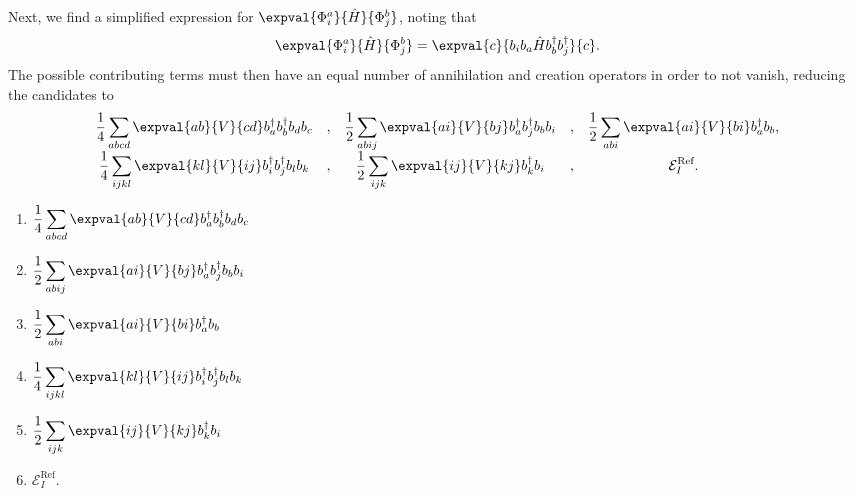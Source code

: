 Next, we find a simplified expression for $\expval{\Phi_i^a}{\hat{H}}{\Phi_j^b}$,
noting that
\begin{equation*}
    \expval{\Phi_i^a}{\hat{H}}{\Phi_j^b} = \expval{c}{b_i b_a \hat{H} b_b^\dagger b_j^\dagger}{c}.
\end{equation*}
The possible contributing terms must then have an equal number of annihilation and creation operators in order to not vanish, reducing the candidates to
\begin{equation*} %
    \begin{array}{cccccc}
        \displaystyle\frac{1}{4} \sum_{abcd} \expval{ab}{V}{cd} b_a^\dagger b_b^\dagger b_d b_c &, &
        \displaystyle\frac{1}{2} \sum_{abij} \expval{ai}{V}{bj} b_a^\dagger b_j^\dagger b_b b_i &, &
        \displaystyle\frac{1}{2} \sum_{abi} \expval{ai}{V}{bi} b_a^\dagger b_b, \\
        \displaystyle\frac{1}{4} \sum_{ijkl} \expval{kl}{V}{ij} b_i^\dagger b_j^\dagger b_l b_k &, &
        \displaystyle\frac{1}{2} \sum_{ijk} \expval{ij}{V}{kj} b_k^\dagger b_i &, &
        \displaystyle\mathcal{E}_I^\text{Ref}.
    \end{array}
\end{equation*}

\begin{multicols}{2}{}
    \begin{enumerate}
        \item  $\displaystyle\frac{1}{4} \sum_{abcd} \expval{ab}{V}{cd} b_a^\dagger b_b^\dagger b_d b_c$
        \item  $\displaystyle\frac{1}{2} \sum_{abij} \expval{ai}{V}{bj} b_a^\dagger b_j^\dagger b_b b_i$
        \item  $\displaystyle\frac{1}{2} \sum_{abi} \expval{ai}{V}{bi} b_a^\dagger b_b$
        \item  $\displaystyle\frac{1}{4} \sum_{ijkl} \expval{kl}{V}{ij} b_i^\dagger b_j^\dagger b_l b_k$
        \item  $\displaystyle\frac{1}{2} \sum_{ijk} \expval{ij}{V}{kj} b_k^\dagger b_i$
        \item  $\displaystyle\mathcal{E}_I^\text{Ref}.$
    \end{enumerate}
\end{multicols}

